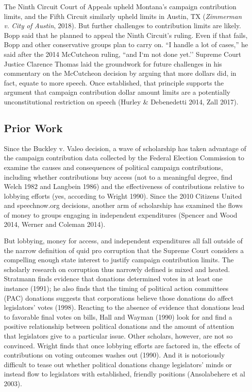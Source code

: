 \documentclass{jopsubmission}
\begin{document}
The Ninth Circuit Court of Appeals upheld Montana's campaign
contribution limits, and the Fifth Circuit similarly upheld limits in
Austin, TX (\emph{Zimmerman v. City of Austin}, 2018). But further
challenges to contribution limits are likely. Bopp said that he planned
to appeal the Ninth Circuit's ruling. Even if that fails, Bopp and other
conservative groups plan to carry on. ``I handle a lot of cases,'' he
said after the 2014 McCutcheon ruling, ``and I`m not done yet.'' Supreme
Court Justice Clarence Thomas laid the groundwork for future challenges
in his commentary on the McCutcheon decision by arguing that more
dollars did, in fact, equate to more speech. Once established, that
principle supports the argument that campaign contribution dollar amount
limits are a potentially unconstitutional restriction on speech (Hurley
\& Debenedetti 2014, Zall 2017).

\subsection{Prior Work}\label{prior-work}

Since the Buckley v. Valeo decision, a wave of scholarship has taken
advantage of the campaign contribution data collected by the Federal
Election Commission to examine the causes and consequences of political
campaign contributions, including whether contributions buy access (not
to a meaningful degree, find Welch 1982 and Langbein 1986) and the
effectiveness of contributions relative to lobbying efforts (yes,
according to Wright 1990). Since the 2010 Citizens United and
speechnow.org decisions, another arm of scholarship has examined the
flows of money to groups engaging in independent expenditures (Spencer
and Wood 2014, Werner and Coleman 2014).

But lobbying, money for access, and independent expenditures all fall
outside of the narrow definition of quid pro corruption that the Supreme
Court considers a compelling enough state interest to justify campaign
contribution limits. The scholarly research on corruption thus narrowly
defined is mixed and heated. Stratmann finds evidence that donations
determined votes in at least one instance (1991); he also finds that the
timing of political action committees (PAC) donations suggests that
corporations believe those donations do affect legislators' votes
(1998). Reacting to the absence of evidence that donations lead to
favorable final votes on bills, Hall and Wayman (1990) look for and find
a positive relationship between political donations and the amount of
attention that legislators give to a particular issue. Other scholars,
however, are not so convinced. Wright finds that once lobbying efforts
are factored in, the effects of contributions on voting outcomes washes
out (1990). And it is notoriously difficult to tease out whether
political donations change legislators' minds or instead flow to
legislators with established, friendly positions (Ansolabehere et al
2003).
\end{document}
